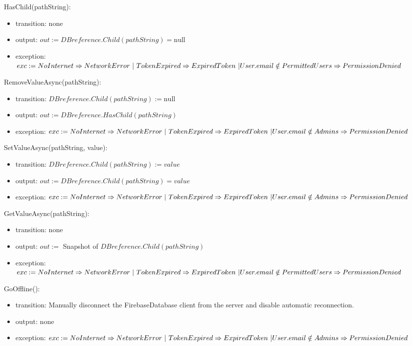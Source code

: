 \documentclass[12pt, titlepage]{article}
\begin{document}
\begin{itemize}
\noindent HasChild(pathString):
\begin{itemize}
\item transition: none 
\item output: $out := DBreference.Child(pathString) = \text{null}$
\item exception: $exc := NoInternet \Rightarrow NetworkError\ | \ TokenExpired \Rightarrow ExpiredToken\ | \\ User.email \notin PermittedUsers \Rightarrow PermissionDenied$
\end{itemize}

\noindent RemoveValueAsync(pathString):
\begin{itemize}
\item transition: $DBreference.Child(pathString) := \text{null}$
\item output: $out := DBreference.HasChild(pathString)$
\item exception: $exc := NoInternet \Rightarrow NetworkError\ | \ TokenExpired \Rightarrow ExpiredToken\ | \\ User.email \notin Admins \Rightarrow PermissionDenied$
\end{itemize}

\noindent SetValueAsync(pathString, value):
\begin{itemize}
\item transition: $DBreference.Child(pathString) := value$
\item output: $out := DBreference.Child(pathString) = value$
\item exception: $exc := NoInternet \Rightarrow NetworkError\ | \ TokenExpired \Rightarrow ExpiredToken\ | \\ User.email \notin Admins \Rightarrow PermissionDenied$
\end{itemize}

\noindent GetValueAsync(pathString):
\begin{itemize}
\item transition: none
\item output: $out :=$ Snapshot of $DBreference.Child(pathString)$
\item exception: $exc := NoInternet \Rightarrow NetworkError\ | \ TokenExpired \Rightarrow ExpiredToken\ | \\ User.email \notin PermittedUsers \Rightarrow PermissionDenied$
\end{itemize}

\noindent GoOffline():
\begin{itemize}
\item transition: Manually disconnect the FirebaseDatabase client from the server and disable automatic reconnection.
\item output: none
\item exception: $exc := NoInternet \Rightarrow NetworkError\ | \ TokenExpired \Rightarrow ExpiredToken\ | \\ User.email \notin Admins \Rightarrow PermissionDenied$
\end{itemize}


\end{itemize}
\end{document}
